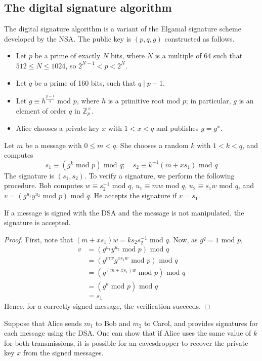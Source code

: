 \subsection{The digital signature algorithm}
The digital signature algorithm is a variant of the Elgamal signature scheme developed by the NSA.
The public key is \( (p, q, g) \) constructed as follows.
\begin{itemize}
    \item Let \( p \) be a prime of exactly \( N \) bits, where \( N \) is a multiple of 64 such that \( 512 \leq N \leq 1024 \), so \( 2^{N-1} < p < 2^N \).
    \item Let \( q \) be a prime of 160 bits, such that \( q \mid p-1 \).
    \item Let \( g \equiv h^{\frac{p-1}{q}} \) mod \( p \), where \( h \) is a primitive root mod \( p \); in particular, \( g \) is an element of order \( q \) in \( \mathbb Z_p^\times \).
    \item Alice chooses a private key \( x \) with \( 1 < x < q \) and publishes \( y = g^x \).
\end{itemize}
Let \( m \) be a message with \( 0 \leq m < q \).
She chooses a random \( k \) with \( 1 < k < q \), and computes
\[ s_1 \equiv (g^k \text{ mod } p) \text{ mod } q;\quad s_2 \equiv k^{-1}(m+xs_1) \text{ mod } q \]
The signature is \( (s_1, s_2) \).
To verify a signature, we perform the following procedure.
Bob computes \( w \equiv s_2^{-1} \) mod \( q \), \( u_1 \equiv mw \) mod \( q \), \( u_2 \equiv s_1 w \) mod \( q \), and \( v = (g^{u_1} y^{u_2} \text{ mod } p) \text{ mod } q \).
He accepts the signature if \( v = s_1 \).
\begin{proposition}
    If a message is signed with the DSA and the message is not manipulated, the signature is accepted.
\end{proposition}
\begin{proof}
    First, note that \( (m + xs_1)w = ks_2s_2^{-1} \) mod \( q \).
    Now, as \( g^q = 1 \) mod \( p \),
    \begin{align*}
        v &= (g^{u_1} y^{u_2} \text{ mod } p) \text{ mod } q \\
        &= (g^{mw} g^{xs_1 w} \text{ mod } p) \text{ mod } q \\
        &= (g^{(m + xs_1)w} \text{ mod } p) \text{ mod } q \\
        &= (g^k \text{ mod } p) \text{ mod } q \\
        &= s_1
    \end{align*}
    Hence, for a correctly signed message, the verification succeeds.
\end{proof}
Suppose that Alice sends \( m_1 \) to Bob and \( m_2 \) to Carol, and provides signatures for each message using the DSA.
One can show that if Alice uses the same value of \( k \) for both transmissions, it is possible for an eavesdropper to recover the private key \( x \) from the signed messages.

